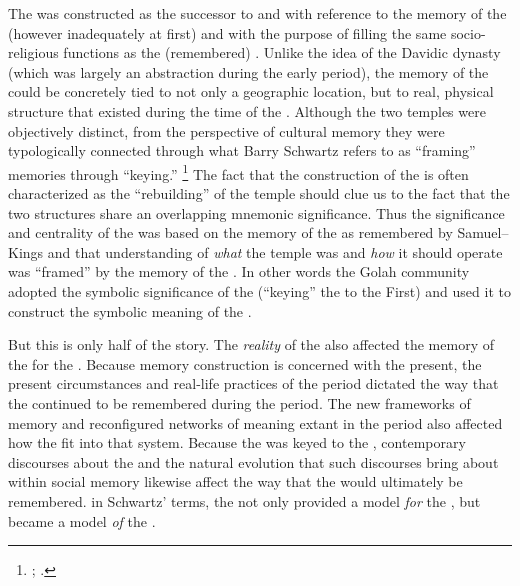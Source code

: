 The \secondtemple was constructed as the successor to and with reference to the memory of the \firsttemple (however inadequately at first) and with the purpose of filling the same socio-religious functions as the (remembered) \firsttemple. Unlike the idea of the Davidic dynasty (which was largely an abstraction during the early \secondtemple period), the memory of the \firsttemple could be concretely tied to not only a geographic location, but to real, physical structure that existed during the time of the \chronicler. Although the two temples were objectively distinct, from the perspective of cultural memory they were typologically  connected through what Barry Schwartz refers to as ``framing'' memories through ``keying.''%
    \footnote{\cite{schwartz_asr1996}; \cite{thatcher_thatcher2014}.}
The fact that the construction of the \secondtemple is often characterized as the ``rebuilding'' of the temple should clue us to the fact that the two structures share an overlapping mnemonic significance. Thus the significance and centrality of the \secondtemple was based on the memory of the \firsttemple as remembered by Samuel--Kings and that understanding of \emph{what} the temple was and \emph{how} it should operate was ``framed'' by the memory of the \firsttemple. In other words the Golah community adopted the symbolic significance of the \firsttemple (``keying'' the \secondtemple to the First) and used it to construct the symbolic meaning of the \secondtemple.

But this is only half of the story. The \emph{reality} of the \secondtemple also affected the memory of the \firsttemple for the \chronicler. Because memory construction is concerned with the present, the present circumstances and real-life practices of the \secondtemple period dictated the way that the \firsttemple continued to be remembered during the \secondtemple period. The new frameworks of memory and reconfigured networks of meaning extant in the \secondtemple period also affected how the \firsttemple fit into that system. Because the \secondtemple was keyed to the \firsttemple, contemporary discourses about the \secondtemple and the natural evolution that such discourses bring about within social memory likewise affect the way that the \firsttemple would ultimately be remembered. in Schwartz' terms, the \firsttemple not only provided a model \emph{for} the \secondtemple, but became a model \emph{of} the \secondtemple.
    \autocite[18]{schwartz2000}

